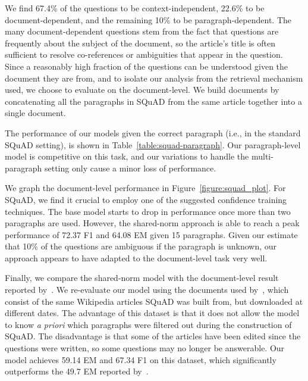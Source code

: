 \documentclass[11pt,a4paper]{article}
\begin{document}

We find 67.4\% of the questions to be context-independent, 22.6\% to be document-dependent, and the remaining 10\% to be paragraph-dependent. The many document-dependent questions stem from the fact that questions are frequently about the subject of the document, so the article's title is often sufficient to resolve co-references or ambiguities that appear in the question. Since a reasonably high fraction of the questions can be understood given the document they are from, and to isolate our analysis from the retrieval mechanism used, we choose to evaluate on the document-level. We build documents by concatenating all the paragraphs in SQuAD from the same article together into a single document. 

The performance of our models given the correct paragraph (i.e., in the standard SQuAD setting), is shown in Table~\ref{table:squad-paragraph}. Our paragraph-level model is competitive on this task, and our variations to handle the multi-paragraph setting only cause a minor loss of performance. 

We graph the document-level performance in Figure~\ref{figure:squad_plot}. For SQuAD, we find it crucial to employ one of the suggested confidence training techniques. The base model starts to drop in performance once more than two paragraphs are used. However, the shared-norm approach is able to reach a peak performance of 72.37 F1 and 64.08 EM given 15 paragraphs. Given our estimate that 10\% of the questions are ambiguous if the paragraph is unknown, our approach appears to have adapted to the document-level task very well.

Finally, we compare the shared-norm model with the document-level result reported by~\citet{openqa}. We re-evaluate our model using the documents used by~\citet{openqa}, which consist of the same Wikipedia articles SQuAD was built from, but downloaded at different dates. The advantage of this dataset is that it does not allow the model to know \textit{a priori} which paragraphs were filtered out during the construction of SQuAD. The disadvantage is that some of the articles have been edited since the questions were written, so some questions may no longer be answerable. Our model achieves 59.14 EM and 67.34 F1 on this dataset, which significantly outperforms the 49.7 EM reported by~\citet{openqa}. 
\end{document}
